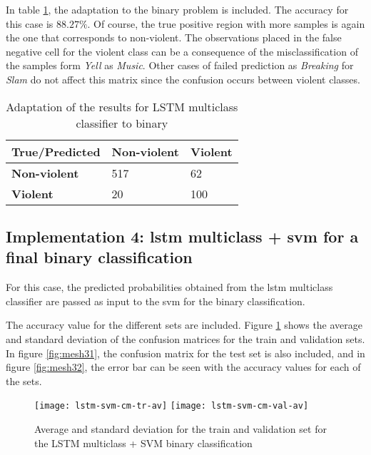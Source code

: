 	In table \ref{table:13}, the adaptation to the binary problem is included. The accuracy for this case is $88.27\%$. Of course, the true positive region with more samples is again the one that corresponds to non-violent. The observations placed in the false negative cell for the violent class can be a consequence of the misclassification of the samples form \textit{Yell} as \textit{Music}. Other cases of failed prediction as \textit{Breaking} for \textit{Slam} do not affect this matrix since the confusion occurs between violent classes.
	
	\begin{table}[H]
		\begin{center}
			\begin{tabular}{| m{6em} || m{6em} | m{6em} ||}
				\hline
				True/Predicted & \textbf{Non-violent} & \textbf{Violent} \\
				\hline\hline
				\textbf{Non-violent} & 517 & 62 \\
				\hline
				\textbf{Violent} & 20 & 100 \\
				\hline
			\end{tabular}
		\end{center}
		\caption{Adaptation of the results for LSTM multiclass classifier to binary}
		\label{table:13}
	\end{table}
	
	
\subsection{Implementation 4: \acrshort{lstm} multiclass + \acrshort{svm} for a final binary classification}
	
	For this case, the predicted probabilities obtained from the \acrshort{lstm} multiclass classifier are passed as input to the \acrshort{svm} for the binary classification. 
	
	The accuracy value for the different sets are included. Figure \ref{fig:mesh30} shows the average and standard deviation of the confusion matrices for the train and validation sets. In figure \ref{fig:mesh31}, the confusion matrix for the test set is also included, and in figure \ref{fig:mesh32}, the error bar can be seen with the accuracy values for each of the sets.
	
	\begin{figure}[H]
		\hspace*{-1.3cm}
		\centering
		\captionsetup{justification=centering}
		\texttt{[image: lstm-svm-cm-tr-av]}%
		\texttt{[image: lstm-svm-cm-val-av]}
		\caption{Average and standard deviation for the train and validation set for the LSTM multiclass + SVM binary classification}
		\label{fig:mesh30}
	\end{figure}

